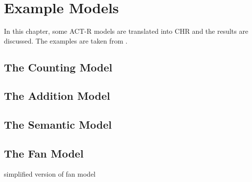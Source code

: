 \chapter{Example Models}

In this chapter, some ACT-R models are translated into CHR and the results are discussed. The examples are taken from  \cite{actr_tutorial}.

\section{The Counting Model}

\section{The Addition Model}

\section{The Semantic Model}

\section{The Fan Model}

simplified version of fan model
